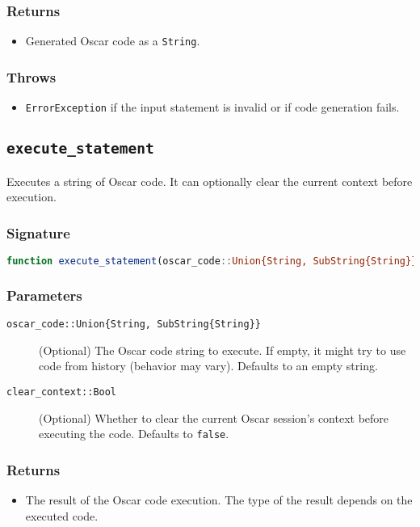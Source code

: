 \documentclass[11pt,a4paper]{article}
\newcommand{\code}[1]{\texttt{#1}}
\newcommand{\func}[1]{\texttt{#1}}
\providecommand{\code}[1]{\texttt{\color{blue!70!black}#1}}
\begin{document}
\subsubsection*{Returns}
\begin{itemize}
    \item Generated Oscar code as a \code{String}.
\end{itemize}

\subsubsection*{Throws}
\begin{itemize}
    \item \code{ErrorException} if the input statement is invalid or if code generation fails.
\end{itemize}


\subsection{\func{execute\_statement}}
\label{func:execute_statement}

Executes a string of Oscar code. It can optionally clear the current context before execution.

\subsubsection*{Signature}
\begin{lstlisting}[language=Julia]
function execute_statement(oscar_code::Union{String, SubString{String}}=""; clear_context=false)
\end{lstlisting}

\subsubsection*{Parameters}
\begin{description}
    \item[\code{oscar\_code::Union\{String, SubString\{String\}\}}] (Optional) The Oscar code string to execute. If empty, it might try to use code from history (behavior may vary). Defaults to an empty string.
    \item[\code{clear\_context::Bool}] (Optional) Whether to clear the current Oscar session's context before executing the code. Defaults to \code{false}.
\end{description}

\subsubsection*{Returns}
\begin{itemize}
    \item The result of the Oscar code execution. The type of the result depends on the executed code.
\end{itemize}
\end{document}
